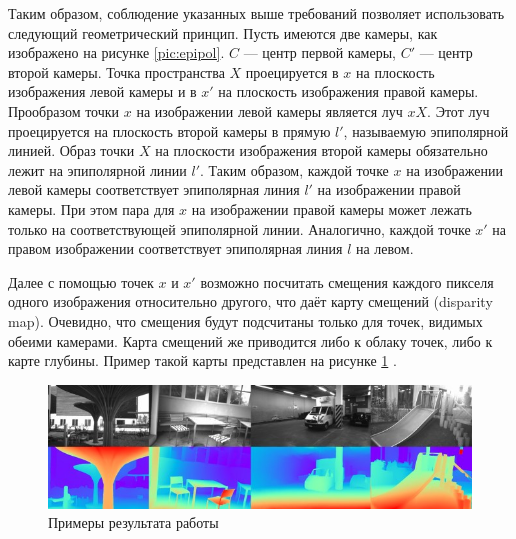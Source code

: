 Таким образом, соблюдение указанных выше требований позволяет использовать следующий геометрический принцип. Пусть имеются две камеры, как изображено 
на рисунке \ref{pic:epipol}. $C$ — центр первой камеры, $C'$ — центр второй камеры. Точка пространства $X$  
проецируется в $x$ на плоскость изображения левой камеры и в $x'$ на плоскость изображения правой камеры. Прообразом точки $x$ на изображении левой 
камеры является луч $xX$. Этот луч проецируется на плоскость второй камеры в прямую $l'$, называемую эпиполярной линией. Образ точки $X$ на плоскости 
изображения второй камеры обязательно лежит на эпиполярной линии $l'$.
Таким образом, каждой точке $x$ на изображении левой камеры соответствует эпиполярная линия $l'$ на изображении правой камеры. При этом пара для $x$ на 
изображении правой камеры может лежать только на соответствующей эпиполярной линии. Аналогично, каждой точке $x'$ на правом изображении соответствует 
эпиполярная линия $l$ на левом.

Далее с помощью точек $x$ и $x'$ возможно посчитать смещения каждого пикселя одного изображения относительно другого, что даёт карту смещений (disparity map). 
Очевидно, что смещения будут подсчитаны только для точек, видимых обеими камерами. Карта смещений же приводится либо к облаку точек, либо к карте глубины. Пример
такой карты представлен на рисунке \ref{pic:depth} \cite{lipson2021raft}. 


\begin{figure}[H]
	\begin{center}
		\includegraphics[scale=0.7]{pics/exmpl.jpg}
		\caption{Примеры результата работы} 
		\label{pic:depth} %
	\end{center}
\end{figure}

